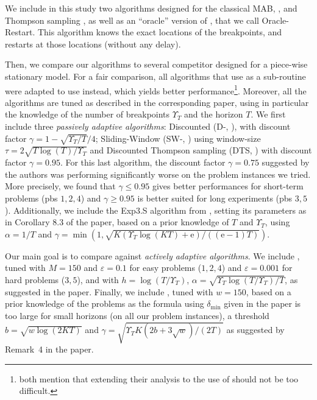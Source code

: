 We include in this study two algorithms designed for the classical MAB, \klUCB{} \cite{Garivier11KL}, and Thompson sampling \cite{AgrawalGoyal11,Kaufmann12Thompson},
as well as an ``oracle'' version of \klUCB, that we call Oracle-Restart. This algorithm knows the exact locations of the breakpoints, and restarts \klUCB{} at those locations (without any delay).

Then, we compare our algorithms to several competitor designed for a piece-wise stationary model. For a fair comparison, all algorithms that use  \UCB{} as a sub-routine were adapted to use \klUCB{} instead, which yields better performance\footnote{\cite{LiuLeeShroff17,CaoZhenKvetonXie18} both mention that extending their analysis to the use of \klUCB{} should not be too difficult.}. Moreover, all the algorithms are tuned as described in the corresponding paper, using in particular the knowledge of the number of breakpoints $\Upsilon_T$ and the horizon $T$. We first include three \emph{passively adaptive algorithms}:
Discounted \klUCB{} (D-\klUCB, \cite{Kocsis06}), with discount factor $\gamma = 1 - \sqrt{\Upsilon_T/T}/4$; Sliding-Window \klUCB{} (SW-\klUCB,  \cite{Garivier11UCBDiscount}) using window-size $\tau = 2 \sqrt{T\log(T)/\Upsilon_T}$ and Discounted Thompson sampling (DTS, \cite{RajKalyani17}) with discount factor $\gamma = 0.95$. For this last algorithm, the discount factor $\gamma=0.75$ suggested by the authors was performing significantly worse on the problem instances we tried.
More precisely, we found that $\gamma\leq0.95$ gives better performances for short-term problems (pbs $1,2,4$) and $\gamma\geq0.95$ is better suited for long experiments (pbs $3,5$).
%
%
Additionally, we include the Exp3.S algorithm from \cite{Auer02NonStochastic}, setting its parameters as in Corollary 8.3 of the paper, based on a prior knowledge of $T$ and $\Upsilon_T$, using $\alpha=1/T$ and $\gamma = \min(1, \sqrt{K (\Upsilon_T \log(KT) + \mathrm{e}) / ((\mathrm{e}-1)T)})$.


Our main goal is to compare against \emph{actively adaptive algorithms}. We include \CUSUMklUCB{} \cite{LiuLeeShroff17}, tuned with $M=150$ and $\varepsilon=0.1$ for easy problems ($1,2,4$) and $\varepsilon=0.001$ for hard problems ($3,5$),
and with $h = \log(T/\Upsilon_T)$, $\alpha = \sqrt{\Upsilon_T \log(T/\Upsilon_T) / T}$, as suggested in the paper.
%
Finally, we include \MklUCB{} \cite{CaoZhenKvetonXie18},
tuned with $w=150$, based on a prior knowledge of the problems as the formula using $\delta_{\min}$ given in the paper is too large for small horizons (on all our problem instances), a threshold $b=\sqrt{w \log(2 K T)}$ and $\gamma=\sqrt{\Upsilon_T K (2 b + 3 \sqrt{w}) / (2 T)}$ as suggested by Remark~4 in the paper.

